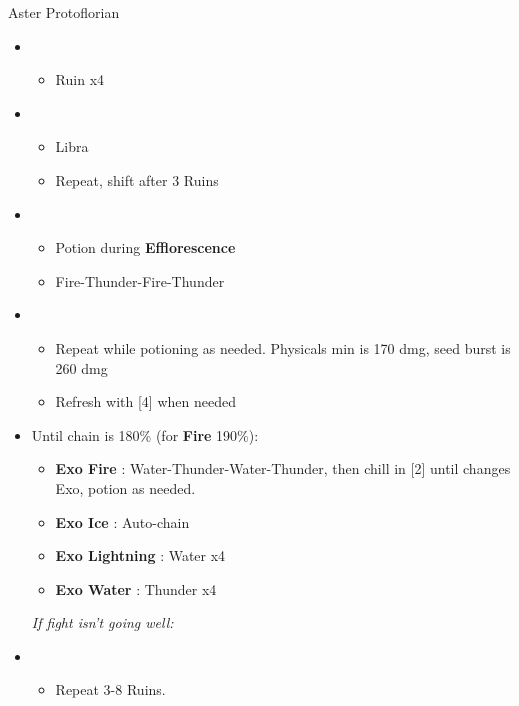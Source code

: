 \begin{battle}[1:43]{Aster Protoflorian}
  \begin{multicols}{2}
    \begin{itemize}
      \item \first
            \begin{itemize}
              \item Ruin x4
            \end{itemize}
      \item \third
            \begin{itemize}
              \item Libra
              \item Repeat, shift after 3 Ruins
            \end{itemize}
      \item \fourth
            \begin{itemize}
              \item Potion during \textbf{Efflorescence}
              \item Fire-Thunder-Fire-Thunder
            \end{itemize}
      \item \fifth
            \begin{itemize}
              \item Repeat while potioning as needed. Physicals min is 170 dmg, seed burst is 260 dmg
              \item Refresh with [4] when needed
            \end{itemize}
      \item Until chain is 180\% (for \textbf{Fire} 190\%):
            \begin{itemize}
              \item \textbf{Exo Fire} : Water-Thunder-Water-Thunder, then chill in [2] until changes Exo, potion as needed.
              \item \textbf{Exo Ice} : Auto-chain
              \item \textbf{Exo Lightning} : Water x4
              \item \textbf{Exo Water} : Thunder x4
            \end{itemize}
            {\it If fight isn't going well:}
      \item \first
            \begin{itemize}
              \item Repeat 3-8 Ruins.
            \end{itemize}

\end{itemize}
\end{multicols}
\end{battle}
